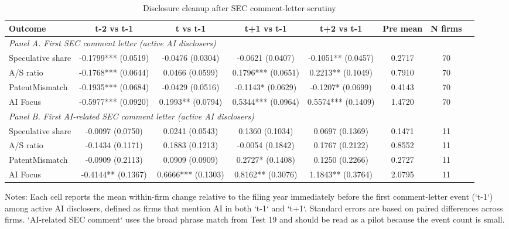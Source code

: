\begin{table}[!htbp]
\centering
\caption{Disclosure cleanup after SEC comment-letter scrutiny}
\label{tab:comment_letter_cleanup_v32}
\small
\begin{tabular}{lccccccl}
\hline
Outcome & t-2 vs t-1 & t vs t-1 & t+1 vs t-1 & t+2 vs t-1 & Pre mean & N firms \\
\hline
\multicolumn{7}{l}{\textit{Panel A. First SEC comment letter (active AI disclosers)}} \\
Speculative share & -0.1799*** (0.0519) & -0.0476 (0.0304) & -0.0621 (0.0407) & -0.1051** (0.0457) & 0.2717 & 70 \\
A/S ratio & -0.1768*** (0.0644) & 0.0466 (0.0599) & 0.1796*** (0.0651) & 0.2213** (0.1049) & 0.7910 & 70 \\
PatentMismatch & -0.1935*** (0.0684) & -0.0429 (0.0516) & -0.1143* (0.0629) & -0.1207* (0.0699) & 0.4143 & 70 \\
AI Focus & -0.5977*** (0.0920) & 0.1993** (0.0794) & 0.5344*** (0.0964) & 0.5574*** (0.1409) & 1.4720 & 70 \\
\hline
\multicolumn{7}{l}{\textit{Panel B. First AI-related SEC comment letter (active AI disclosers)}} \\
Speculative share & -0.0097 (0.0750) & 0.0241 (0.0543) & 0.1360 (0.1034) & 0.0697 (0.1369) & 0.1471 & 11 \\
A/S ratio & -0.1434 (0.1171) & 0.1883 (0.1213) & -0.0054 (0.1842) & 0.1767 (0.2122) & 0.8552 & 11 \\
PatentMismatch & -0.0909 (0.2113) & 0.0909 (0.0909) & 0.2727* (0.1408) & 0.1250 (0.2266) & 0.2727 & 11 \\
AI Focus & -0.4144** (0.1367) & 0.6666*** (0.1303) & 0.8162** (0.3076) & 1.1843** (0.3764) & 2.0795 & 11 \\
\hline
\end{tabular}
\begin{flushleft}
\footnotesize Notes: Each cell reports the mean within-firm change relative to the filing year immediately before the first comment-letter event (`t-1`) among active AI disclosers, defined as firms that mention AI in both `t-1` and `t+1`. Standard errors are based on paired differences across firms. `AI-related SEC comment` uses the broad phrase match from Test 19 and should be read as a pilot because the event count is small.
\end{flushleft}
\end{table}
